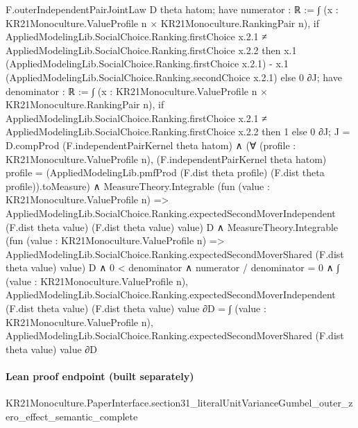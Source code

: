 \documentclass[10pt]{article}
\begin{document}
\begin{ReviewVerbatim}
            F.outerIndependentPairJointLaw D theta hatom;
          have numerator : ℝ :=
            ∫ (x : KR21Monoculture.ValueProfile n × KR21Monoculture.RankingPair n),
              if
                  AppliedModelingLib.SocialChoice.Ranking.firstChoice x.2.1 ≠
                    AppliedModelingLib.SocialChoice.Ranking.firstChoice x.2.2 then
                x.1 (AppliedModelingLib.SocialChoice.Ranking.firstChoice x.2.1) -
                  x.1 (AppliedModelingLib.SocialChoice.Ranking.secondChoice x.2.1)
              else 0 ∂J;
          have denominator : ℝ :=
            ∫ (x : KR21Monoculture.ValueProfile n × KR21Monoculture.RankingPair n),
              if
                  AppliedModelingLib.SocialChoice.Ranking.firstChoice x.2.1 ≠
                    AppliedModelingLib.SocialChoice.Ranking.firstChoice x.2.2 then
                1
              else 0 ∂J;
          J = D.compProd (F.independentPairKernel theta hatom) ∧
            (∀ (profile : KR21Monoculture.ValueProfile n),
                (F.independentPairKernel theta hatom) profile =
                  (AppliedModelingLib.pmfProd (F.dist theta profile) (F.dist theta profile)).toMeasure) ∧
              MeasureTheory.Integrable
                  (fun (value : KR21Monoculture.ValueProfile n) =>
                    AppliedModelingLib.SocialChoice.Ranking.expectedSecondMoverIndependent (F.dist theta value)
                      (F.dist theta value) value)
                  D ∧
                MeasureTheory.Integrable
                    (fun (value : KR21Monoculture.ValueProfile n) =>
                      AppliedModelingLib.SocialChoice.Ranking.expectedSecondMoverShared (F.dist theta value) value)
                    D ∧
                  0 < denominator ∧
                    numerator / denominator = 0 ∧
                      ∫ (value : KR21Monoculture.ValueProfile n),
                          AppliedModelingLib.SocialChoice.Ranking.expectedSecondMoverIndependent (F.dist theta value)
                            (F.dist theta value) value ∂D =
                        ∫ (value : KR21Monoculture.ValueProfile n),
                          AppliedModelingLib.SocialChoice.Ranking.expectedSecondMoverShared (F.dist theta value)
                            value ∂D
\end{ReviewVerbatim}

\paragraph{Lean proof endpoint (built separately)}\begin{ReviewVerbatim}
KR21Monoculture.PaperInterface.section31_literalUnitVarianceGumbel_outer_zero_effect_semantic_complete
\end{ReviewVerbatim}
\end{document}
